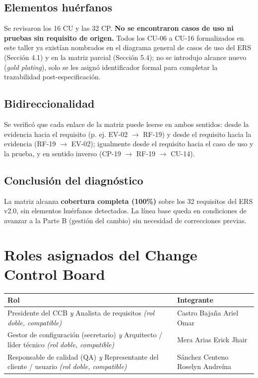 \documentclass[11pt,a4paper]{article}
\begin{document}
\subsection{Elementos huérfanos}
Se revisaron los 16 CU y las 32 CP. \textbf{No se encontraron casos de uso ni pruebas sin requisito de origen.} Todos los CU-06 a CU-16 formalizados en este taller ya existían nombrados en el diagrama general de casos de uso del ERS (Sección 4.1) y en la matriz parcial (Sección 5.4); no se introdujo alcance nuevo (\emph{gold plating}), solo se les asignó identificador formal para completar la trazabilidad post-especificación.

\subsection{Bidireccionalidad}
Se verificó que cada enlace de la matriz puede leerse en ambos sentidos: desde la evidencia hacia el requisito (p. ej. EV-02 $\rightarrow$ RF-19) y desde el requisito hacia la evidencia (RF-19 $\rightarrow$ EV-02); igualmente desde el requisito hacia el caso de uso y la prueba, y en sentido inverso (CP-19 $\rightarrow$ RF-19 $\rightarrow$ CU-14).

\subsection{Conclusión del diagnóstico}
La matriz alcanza \textbf{cobertura completa (100\%)} sobre los 32 requisitos del ERS v2.0, sin elementos huérfanos detectados. La línea base queda en condiciones de avanzar a la Parte B (gestión del cambio) sin necesidad de correcciones previas.

\section{Roles asignados del Change Control Board}

\begin{longtable}{|p{5.5cm}|p{7cm}|}
\hline
\textbf{Rol} & \textbf{Integrante} \\ \hline
\endhead
Presidente del CCB \emph{y} Analista de requisitos \emph{(rol doble, compatible)} & Castro Bajaña Ariel Omar \\ \hline
Gestor de configuración (secretario) \emph{y} Arquitecto / líder técnico \emph{(rol doble, compatible)} & Mera Arias Erick Jhair \\ \hline
Responsable de calidad (QA) \emph{y} Representante del cliente / usuario \emph{(rol doble, compatible)} & Sánchez Centeno Roselyn Andreína \\ \hline
\end{longtable}
\end{document}
